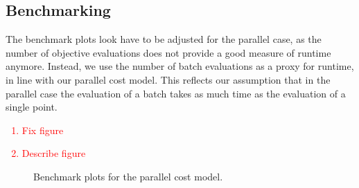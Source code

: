 \begin{algorithm}[H]
{        
    }

    \end{algorithm}
\newpage
\restoregeometry

\subsection{Benchmarking}\label{subsec:parallelization::benchmarking}

The benchmark plots look have to be adjusted for the parallel case, as the number of objective
evaluations does not provide a good measure of runtime anymore. Instead, we use the number of batch
evaluations as a proxy for runtime, in line with our parallel cost model. This reflects our
assumption that in the parallel case the evaluation of a batch takes as much time as the evaluation
of a single point.

\textcolor{red}{
\begin{enumerate}
    \item Fix figure
    \item Describe figure
\end{enumerate}
}


\begin{figure}[ht]\label{fig:parallelization::benchmark}
    \caption{Benchmark plots for the parallel cost model.}
\end{figure}
